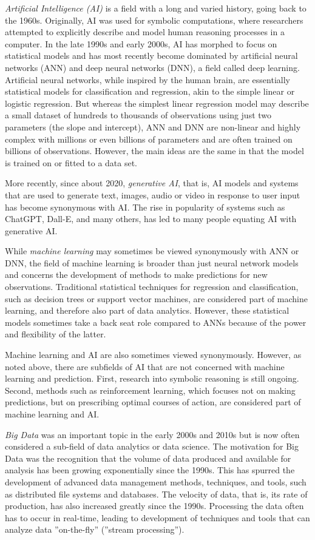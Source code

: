 \emph{Artificial Intelligence (AI)} is a field with a long and varied history, going back to the 1960s. Originally, AI was used for symbolic computations, where researchers attempted to explicitly describe and model human reasoning processes in a computer. In the late 1990s and early 2000s, AI has morphed to focus on statistical models and has most recently become dominated by artificial neural networks (ANN) and deep neural networks (DNN), a field called deep learning. Artificial neural networks, while inspired by the human brain, are essentially statistical models for classification and regression, akin to the simple linear or logistic regression. But whereas the simplest linear regression model may describe a small dataset of hundreds to thousands of observations using just two parameters (the slope and intercept), ANN and DNN are non-linear and highly complex with millions or even billions of parameters and are often trained on billions of observations. However, the main ideas are the same in that the model is trained on or fitted to a data set. 

More recently, since about 2020, \emph{generative AI}, that is, AI models and systems that are used to generate text, images, audio or video in response to user input has become synonymous with AI. The rise in popularity of systems such as ChatGPT, Dall-E, and many others, has led to many people equating AI with generative AI.

While \emph{machine learning} may sometimes be viewed synonymously with ANN or DNN, the field of machine learning is broader than just neural network models and concerns the development of methods to make predictions for new observations. Traditional statistical techniques for regression and classification, such as decision trees or support vector machines, are considered part of machine learning, and therefore also part of data analytics. However, these statistical models sometimes take a back seat role compared to ANNs because of the power and flexibility of the latter. 

Machine learning and AI are also sometimes viewed synonymously. However, as noted above, there are subfields of AI that are not concerned with machine learning and prediction. First, research into symbolic reasoning is still ongoing. Second, methods such as reinforcement learning, which focuses not on making predictions, but on prescribing optimal courses of action, are considered part of machine learning and AI.

\emph{Big Data} was an important topic in the early 2000s and 2010s but is now often considered a sub-field of data analytics or data science. The motivation for Big Data was the recognition that the volume of data produced and available for analysis has been growing exponentially since the 1990s. This has spurred the development of advanced data management methods, techniques, and tools, such as distributed file systems and databases. The velocity of data, that is, its rate of production, has also increased greatly since the 1990s. Processing the data often has to occur in real-time, leading to development of techniques and tools that can analyze data ''on-the-fly'' (''stream processing'').

